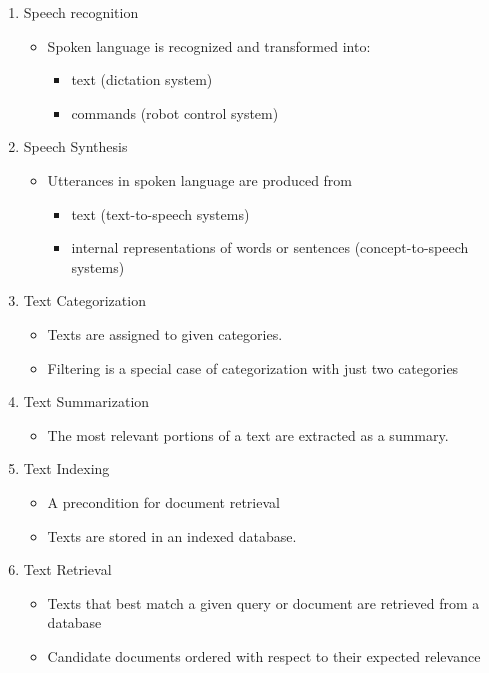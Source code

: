 \documentclass[11pt]{article}
\begin{document}
\begin{enumerate}
 \item Speech recognition
\begin{itemize}
 \item Spoken language is recognized and transformed into:
\begin{itemize}
 \item text (dictation system)
 \item commands (robot control system)
\end{itemize}
\end{itemize}
 \item Speech Synthesis
\begin{itemize}
 \item Utterances in spoken language are produced from 
\begin{itemize}
 \item text (text-to-speech systems)
 \item internal representations of words or sentences (concept-to-speech systems)
\end{itemize}
\end{itemize}
 \item Text Categorization
\begin{itemize}
 \item Texts are assigned to given categories.
 \item Filtering is a special case of categorization with just two categories
\end{itemize}
 \item Text Summarization
\begin{itemize}
 \item The most relevant portions of a text are extracted as a summary.
\end{itemize}
 \item Text Indexing
\begin{itemize}
 \item A precondition for document retrieval
 \item Texts are stored in an indexed database.
\end{itemize}
 \item Text Retrieval
\begin{itemize}
 \item Texts that best match a given query or document are retrieved from a database
 \item Candidate documents ordered with respect to their expected relevance 
\end{itemize}

\end{enumerate}
\end{document}
